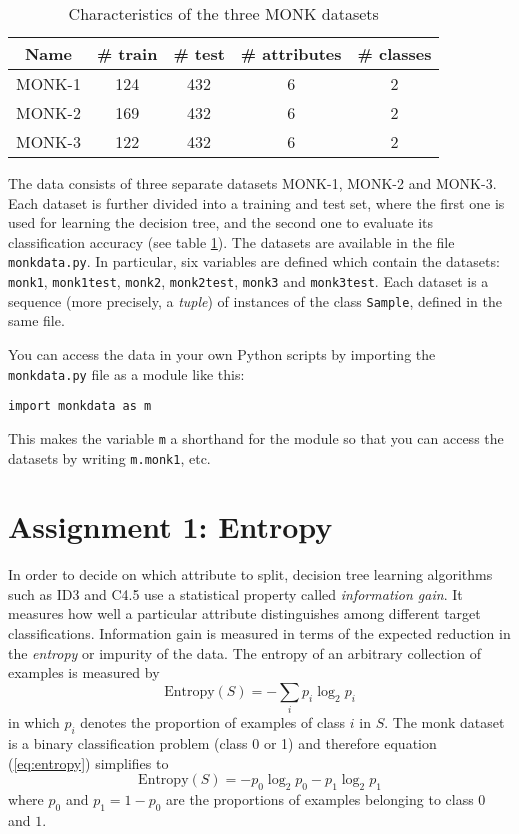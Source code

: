 \documentclass[11pt]{article}
\begin{document}
\begin{table}
  \caption{Characteristics of the three MONK datasets \label{tab:monk}}
  \begin{center}
    \begin{tabular}{|c|c|c|c|c|}\hline
      Name & \# train & \# test & \# attributes & \# classes\\ \hline \hline
      MONK-1 & 124 & 432 & 6 & 2\\ \hline
      MONK-2 & 169 & 432 & 6 & 2\\ \hline
      MONK-3 & 122 & 432 & 6 & 2\\ \hline
    \end{tabular}
  \end{center}
\end{table}

The data consists of three separate datasets MONK-1, MONK-2 and
MONK-3.  Each dataset is further divided into a training and test set,
where the first one is used for learning the decision tree, and the
second one to evaluate its classification accuracy (see table
\ref{tab:monk}).  The datasets are available in
the file \verb!monkdata.py!.  In particular, six variables are defined
which contain the datasets:
\verb!monk1!, \verb!monk1test!, \verb!monk2!,
\verb!monk2test!, \verb!monk3! and \verb!monk3test!.
Each dataset is a sequence (more precisely, a \emph{tuple}) of instances
of the class \texttt{Sample}, defined in the same file.

You can access the data in your own Python scripts by importing
the \texttt{monkdata.py} file as a module like this:
\begin{verbatim}
import monkdata as m
\end{verbatim}

This makes the variable \texttt{m} a shorthand for the module so that
you can access the datasets by writing \verb!m.monk1!, etc.


\section{Assignment 1: Entropy}

In order to decide on which attribute to split, decision tree learning
algorithms such as ID3 and C4.5 use a statistical property called
\emph{information gain}.  It measures how well a particular attribute
distinguishes among different target classifications.  Information
gain is measured in terms of the expected reduction in the
\emph{entropy} or impurity of the data.  The entropy of an arbitrary
collection of examples is measured by
\begin{equation}
\textrm{Entropy}(S) = - \sum_i p_i \log_2 p_i
\label{eq:entropy}
\end{equation}
in which $p_i$ denotes the proportion of examples of class $i$ in $S$. 
The monk dataset is a binary classification problem (class 0 or 1) and
therefore equation (\ref{eq:entropy}) simplifies to
\begin{equation}
\textrm{Entropy}(S) = - p_0 \log_2 p_0 - p_1 \log_2 p_1
\end{equation}
where $p_0$ and $p_1=1-p_0$ are the proportions of examples belonging to class 
$0$ and $1$.\\[2ex]
\end{document}
